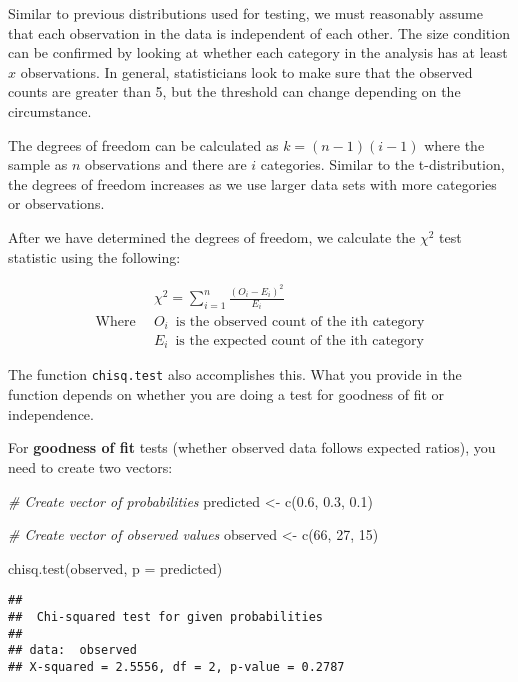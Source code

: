 \documentclass[
]{article}
\newenvironment{Shaded}{\begin{snugshade}}{\end{snugshade}}
\newcommand{\AttributeTok}[1]{\textcolor[rgb]{0.77,0.63,0.00}{#1}}
\newcommand{\CommentTok}[1]{\textcolor[rgb]{0.56,0.35,0.01}{\textit{#1}}}
\newcommand{\DecValTok}[1]{\textcolor[rgb]{0.00,0.00,0.81}{#1}}
\newcommand{\FloatTok}[1]{\textcolor[rgb]{0.00,0.00,0.81}{#1}}
\newcommand{\FunctionTok}[1]{\textcolor[rgb]{0.00,0.00,0.00}{#1}}
\newcommand{\NormalTok}[1]{#1}
\newcommand{\OtherTok}[1]{\textcolor[rgb]{0.56,0.35,0.01}{#1}}
\begin{document}
Similar to previous distributions used for testing, we must reasonably assume that each observation in the data is independent of each other. The size condition can be confirmed by looking at whether each category in the analysis has at least \(x\) observations. In general, statisticians look to make sure that the observed counts are greater than 5, but the threshold can change depending on the circumstance.

The degrees of freedom can be calculated as \(k=(n-1)(i-1)\) where the sample as \(n\) observations and there are \(i\) categories. Similar to the t-distribution, the degrees of freedom increases as we use larger data sets with more categories or observations.

After we have determined the degrees of freedom, we calculate the \(\chi^2\) test statistic using the following:

\[ \begin{split} 
&\chi^2 =  \sum_{i=1}^{n}\frac{(O_i-E_i)^2}{E_i} \\
\textrm{Where} \enspace &O_i \enspace \textrm{is the observed count of the ith category} \\ 
&E_i \enspace \textrm{is the expected count of the ith category}
\end{split}\]

The function \texttt{chisq.test} also accomplishes this. What you provide in the function depends on whether you are doing a test for goodness of fit or independence.

For \textbf{goodness of fit} tests (whether observed data follows expected ratios), you need to create two vectors:

\begin{Shaded}
\begin{Highlighting}[]
\CommentTok{\# Create vector of probabilities}
\NormalTok{predicted }\OtherTok{\textless{}{-}} \FunctionTok{c}\NormalTok{(}\FloatTok{0.6}\NormalTok{, }\FloatTok{0.3}\NormalTok{, }\FloatTok{0.1}\NormalTok{)}

\CommentTok{\# Create vector of observed values}
\NormalTok{observed }\OtherTok{\textless{}{-}} \FunctionTok{c}\NormalTok{(}\DecValTok{66}\NormalTok{, }\DecValTok{27}\NormalTok{, }\DecValTok{15}\NormalTok{)}

\FunctionTok{chisq.test}\NormalTok{(observed, }\AttributeTok{p =}\NormalTok{ predicted)}
\end{Highlighting}
\end{Shaded}

\begin{verbatim}
## 
##  Chi-squared test for given probabilities
## 
## data:  observed
## X-squared = 2.5556, df = 2, p-value = 0.2787
\end{verbatim}
\end{document}
